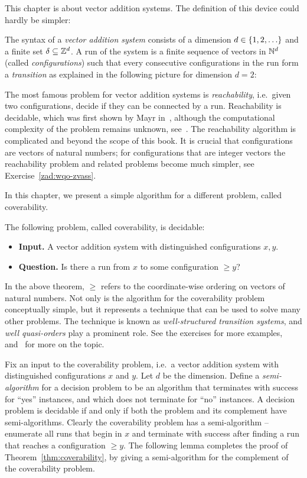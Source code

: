 This chapter is about vector addition systems. The definition of this device could hardly be simpler:
\begin{definition}
The syntax of a \emph{vector addition system} consists of a dimension $d \in \{1,2,\ldots\}$ and a  finite set $\delta \subseteq \mathbb{Z}^d$. A run of the system is a finite sequence of vectors in $\mathbb{N}^d$ (called \emph{configurations}) such that every consecutive configurations in the run form a \emph{transition} as explained in the following picture for dimension $d=2$:
\end{definition}
The most famous problem for vector addition systems is \emph{reachability}, i.e.~given two configurations, decide if they can be connected by a run. Reachability is decidable, which was first shown by  Mayr in~\cite{Mayr:1984jg}, although the computational complexity of the problem remains unknown, see~\cite{Schmitz:2016kp}. The reachability algorithm is complicated and beyond the scope of this book. It is crucial that configurations are vectors of natural numbers; for configurations that are  integer vectors the reachability problem and related problems become much simpler, see Exercise~\ref{zad:wqo-zvass}.

 In this chapter, we present a simple algorithm for a different problem, called  coverability.
\begin{theorem}\label{thm:coverability}
	The following problem, called coverability, is decidable:
	\begin{itemize}
		\item {\bf Input.} A vector addition system with distinguished configurations $x,y$.
		\item {\bf Question.} Is there a run from $x$ to some configuration $\ge y$?
	\end{itemize}
\end{theorem}

In the above theorem, $\ge$ refers to the coordinate-wise ordering on vectors of natural numbers.
Not only is the algorithm for the coverability problem conceptually simple, but it represents a technique that can be used to solve many other problems. The technique is known as \emph{well-structured transition systems}, and \emph{well quasi-orders} play a prominent role. See the exercises for more examples, and~\cite{Schmitz:2013ev} for more on the topic.

Fix an input to the coverability problem, i.e.~a vector addition system with distinguished configurations $x$ and $y$. Let $d$ be the dimension. Define a \emph{semi-algorithm} for a decision problem to be an algorithm that terminates with success for ``yes'' instances, and which does not terminate for ``no'' instances. A decision problem is decidable if and only if both the problem and its complement have semi-algorithms. Clearly the coverability problem has a semi-algorithm --  enumerate all runs that begin in $x$ and terminate with success after finding a run that reaches a configuration $\ge y$. The following lemma completes the proof of Theorem~\ref{thm:coverability}, by giving a semi-algorithm for the complement of the coverability problem.

